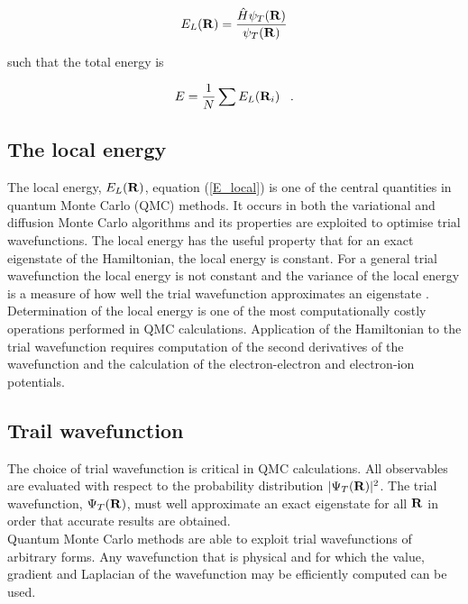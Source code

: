 \documentclass{article}
\begin{document}
\begin{equation}
\label{E_local}
E_{L}({\bf R})=\frac{\hat{H}\psi_{T}({\bf R})}{\psi_{T}({\bf R})}
\end{equation}

such that the total energy is 

\begin{equation}
E=\frac{1}{N} \sum E_{L}({\bf R}_i) \;\;\;.
\end{equation}


\subsection{The local energy}

The local energy,  $E_{L}({\bf R})$, equation (\ref{E_local}) is one of the central quantities in quantum Monte Carlo (QMC) methods. It occurs in both the variational and diffusion Monte Carlo algorithms and its properties are exploited to optimise trial wavefunctions. The local energy has the useful property that for an exact eigenstate of the Hamiltonian, the local energy is constant. For a general trial wavefunction the local energy is not constant and the variance of the local energy is a measure of how well the trial wavefunction approximates an eigenstate \citep{phd}. \\

Determination of the local energy is one of the most computationally costly operations performed in QMC calculations. Application of the Hamiltonian to the trial wavefunction requires computation of the second derivatives of the wavefunction and the calculation of the electron-electron and electron-ion potentials.

\subsection{Trail wavefunction}

The choice of trial wavefunction is critical in QMC calculations. All observables are evaluated with respect to the probability distribution  $\vert\Psi_T({\bf R})\vert^2$. The trial wavefunction,  $\Psi_T({\bf R})$, must well approximate an exact eigenstate for all ${\bf R}$ in order that accurate results are obtained. \\

Quantum Monte Carlo methods are able to exploit trial wavefunctions of arbitrary forms. Any wavefunction that is physical and for which the value, gradient and Laplacian of the wavefunction may be efficiently computed can be used\citep{phd}. \\
\end{document}
